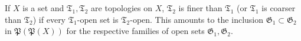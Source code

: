 If $X$ is a set and $\mathfrak{T}_1, \mathfrak{T}_2$ are topologies on $X$, $\mathfrak{T}_2$ is finer than $\mathfrak{T}_1$ (or $\mathfrak{T}_1$ is coarser than $\mathfrak{T}_2$) if every $\mathfrak{T}_1$-open set is $\mathfrak{T}_2$-open. This amounts to the inclusion $\mathfrak{G}_1 \subset \mathfrak{G}_2$ in $\mathfrak{P}(\mathfrak{P}(X))$ for the respective families of open sets $\mathfrak{G}_1, \mathfrak{G}_2$.
